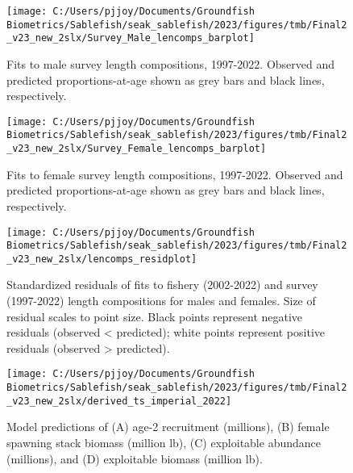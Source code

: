 \documentclass[
]{article}
\begin{document}
\begin{figure}[H]

{\centering \texttt{[image: C:/Users/pjjoy/Documents/Groundfish Biometrics/Sablefish/seak\_sablefish/2023/figures/tmb/Final2\_v23\_new\_2slx/Survey\_Male\_lencomps\_barplot]} 

}

\caption{Fits to male survey length compositions, 1997-2022. Observed and predicted proportions-at-age shown as grey bars and black lines, respectively.}\label{fig:malesrvlen}
\end{figure}

\begin{figure}[H]

{\centering \texttt{[image: C:/Users/pjjoy/Documents/Groundfish Biometrics/Sablefish/seak\_sablefish/2023/figures/tmb/Final2\_v23\_new\_2slx/Survey\_Female\_lencomps\_barplot]} 

}

\caption{Fits to female survey length compositions, 1997-2022. Observed and predicted proportions-at-age shown as grey bars and black lines, respectively.}\label{fig:femalesrvlen}
\end{figure}

\begin{figure}[H]

{\centering \texttt{[image: C:/Users/pjjoy/Documents/Groundfish Biometrics/Sablefish/seak\_sablefish/2023/figures/tmb/Final2\_v23\_new\_2slx/lencomps\_residplot]} 

}

\caption{Standardized residuals of fits to fishery (2002-2022) and survey (1997-2022) length compositions for males and females. Size of residual scales to point size. Black points represent negative residuals (observed < predicted); white points represent positive residuals (observed > predicted).}\label{fig:residlen}
\end{figure}

\begin{figure}[H]

{\centering \texttt{[image: C:/Users/pjjoy/Documents/Groundfish Biometrics/Sablefish/seak\_sablefish/2023/figures/tmb/Final2\_v23\_new\_2slx/derived\_ts\_imperial\_2022]} 

}

\caption{Model predictions of (A) age-2 recruitment (millions), (B) female spawning stack biomass (million lb), (C) exploitable abundance (millions), and (D) exploitable biomass (million lb).}\label{fig:derivedts}
\end{figure}
\end{document}
